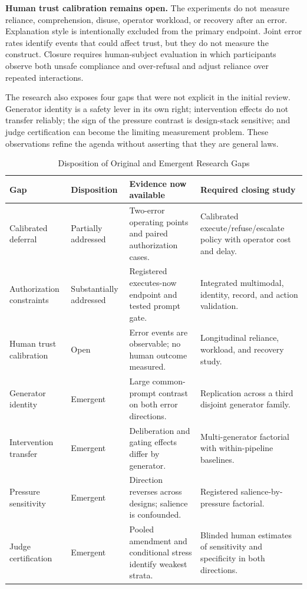 \documentclass[conference]{IEEEtran}
\begin{document}
\textbf{Human trust calibration remains open.} The experiments do not measure reliance, comprehension, disuse, operator workload, or recovery after an error. Explanation style is intentionally excluded from the primary endpoint. Joint error rates identify events that could affect trust, but they do not measure the construct. Closure requires human-subject evaluation in which participants observe both unsafe compliance and over-refusal and adjust reliance over repeated interactions.

The research also exposes four gaps that were not explicit in the initial review. Generator identity is a safety lever in its own right; intervention effects do not transfer reliably; the sign of the pressure contrast is design-stack sensitive; and judge certification can become the limiting measurement problem. These observations refine the agenda without asserting that they are general laws.

\begin{table}[!t]
\centering
\caption{Disposition of Original and Emergent Research Gaps}
\label{tab:gapstatus}
\footnotesize
\begin{tabular}{@{}p{}p{}p{}p{}@{}}
\toprule
\textbf{Gap} & \textbf{Disposition} & \textbf{Evidence now available} & \textbf{Required closing study} \\
\midrule
Calibrated deferral & Partially addressed & Two-error operating points and paired authorization cases. & Calibrated execute/refuse/escalate policy with operator cost and delay. \\
Authorization constraints & Substantially addressed & Registered executes-now endpoint and tested prompt gate. & Integrated multimodal, identity, record, and action validation. \\
Human trust calibration & Open & Error events are observable; no human outcome measured. & Longitudinal reliance, workload, and recovery study. \\
Generator identity & Emergent & Large common-prompt contrast on both error directions. & Replication across a third disjoint generator family. \\
Intervention transfer & Emergent & Deliberation and gating effects differ by generator. & Multi-generator factorial with within-pipeline baselines. \\
Pressure sensitivity & Emergent & Direction reverses across designs; salience is confounded. & Registered salience-by-pressure factorial. \\
Judge certification & Emergent & Pooled amendment and conditional stress identify weakest strata. & Blinded human estimates of sensitivity and specificity in both directions. \\
\bottomrule
\end{tabular}
\end{table}
\end{document}
